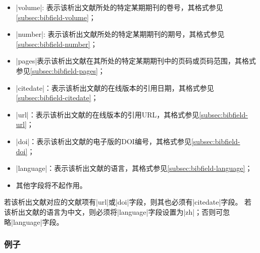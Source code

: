 \begin{itemize}
\item |volume|: 表示该析出文献所处的特定某期期刊的卷号，其格式参见\ref{subsec:bibfield-volume}；
\item |number|: 表示该析出文献所处的特定某期期刊的期号，其格式参见\ref{subsec:bibfield-number}；
\item |pages|表示该析出文献在其所处的特定某期期刊中的页码或页码范围，其格式参见\ref{subsec:bibfield-pages}；
\item |citedate|：表示该析出文献的在线版本的引用日期，其格式参见\ref{subsec:bibfield-citedate}；
\item |url|：表示该析出文献的在线版本的引用URL，其格式参见\ref{subsec:bibfield-url}；
\item |doi|：表示该析出文献的电子版的DOI编号，其格式参见\ref{subsec:bibfield-doi}；
\item |language|：表示该析出文献的语言，其格式参见\ref{subsec:bibfield-language}；
\item 其他字段将不起作用。
\end{itemize}

\begin{note}
若该析出文献对应的文献项有|url|或|doi|字段，则其也必须有|citedate|字段。
若该析出文献的语言为中文，则必须将|language|字段设置为|zh|；否则可忽略|language|字段。
\end{note}

\subsubsection{例子}

